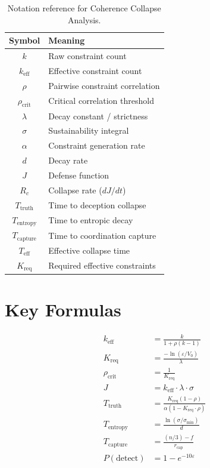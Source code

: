 \documentclass[11pt,a4paper]{article}
\theoremstyle{definition}
\theoremstyle{remark}
\newcommand{\keff}{k_{\text{eff}}}
\newcommand{\Kreq}{K_{\text{req}}}
\newcommand{\Ttruth}{T_{\text{truth}}}
\newcommand{\Tentropy}{T_{\text{entropy}}}
\newcommand{\Tcapture}{T_{\text{capture}}}
\newcommand{\Teff}{T_{\text{eff}}}
\newcommand{\rhocrit}{\rho_{\text{crit}}}
\newcommand{\sigmin}{\sigma_{\text{min}}}
\begin{document}
\begin{table}[H]
\centering
\begin{tabular}{cl}
\toprule
\textbf{Symbol} & \textbf{Meaning} \\
\midrule
$k$ & Raw constraint count \\
$\keff$ & Effective constraint count \\
$\rho$ & Pairwise constraint correlation \\
$\rhocrit$ & Critical correlation threshold \\
$\lambda$ & Decay constant / strictness \\
$\sigma$ & Sustainability integral \\
$\alpha$ & Constraint generation rate \\
$d$ & Decay rate \\
$J$ & Defense function \\
$R_c$ & Collapse rate ($dJ/dt$) \\
$\Ttruth$ & Time to deception collapse \\
$\Tentropy$ & Time to entropic decay \\
$\Tcapture$ & Time to coordination capture \\
$\Teff$ & Effective collapse time \\
$\Kreq$ & Required effective constraints \\
\bottomrule
\end{tabular}
\caption{Notation reference for Coherence Collapse Analysis.}
\end{table}

\section{Key Formulas}

\begin{align}
\keff &= \frac{k}{1 + \rho(k-1)} \tag{Effective Constraints} \\[1em]
\Kreq &= \frac{-\ln(\varepsilon/V_0)}{\lambda} \tag{Required Constraints} \\[1em]
\rhocrit &= \frac{1}{\Kreq} \tag{Critical Correlation} \\[1em]
J &= \keff \cdot \lambda \cdot \sigma \tag{Defense Function} \\[1em]
\Ttruth &= \frac{\Kreq(1-\rho)}{\alpha(1-\Kreq \cdot \rho)} \tag{Time to Truth} \\[1em]
\Tentropy &= \frac{\ln(\sigma/\sigmin)}{d} \tag{Time to Entropy} \\[1em]
\Tcapture &= \frac{(n/3) - f}{r_{\text{cap}}} \tag{Time to Capture} \\[1em]
P(\text{detect}) &= 1 - e^{-10\varepsilon} \tag{Detection Probability}
\end{align}
\end{document}
